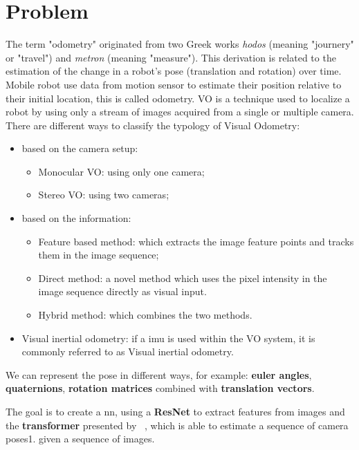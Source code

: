 \section{Problem}\label{sec:problem}
The term "odometry" originated from two Greek works \emph{hodos} (meaning "journery" or "travel") and \emph{metron} (meaning "measure").
This derivation is related to the estimation of the change in a robot's pose (translation and rotation) over time.
Mobile robot use data from motion sensor to estimate their position relative to their initial location, this is called odometry.
VO is a technique used to localize a robot by using only a stream of images acquired from a single or multiple camera.
There are different ways to classify the typology of Visual Odometry:
\begin{itemize}
    \item based on the camera setup:
        \begin{itemize}
            \item Monocular VO: using only one camera;
            \item Stereo VO: using two cameras;
        \end{itemize}
    \item based on the information:
        \begin{itemize}
            \item Feature based method: which extracts the image feature points and tracks them in the image sequence;
            \item Direct method: a novel method which uses the pixel intensity in the image sequence directly as visual input.
            \item Hybrid method: which combines the two methods.
        \end{itemize}
    \item Visual inertial odometry: if a \gls{imu} is used within the VO system, it is commonly referred to as Visual inertial odometry.
\end{itemize}
We can represent the pose in different ways, for example: \textbf{euler angles}, \textbf{quaternions}, \textbf{rotation matrices} combined with \textbf{translation vectors}.

The goal is to create a \gls{nn}, using a \textbf{ResNet} to extract features from images and the \textbf{transformer} presented by ~\cite{transformer_paper}, which is able to estimate a sequence of camera poses1. given a sequence of images.